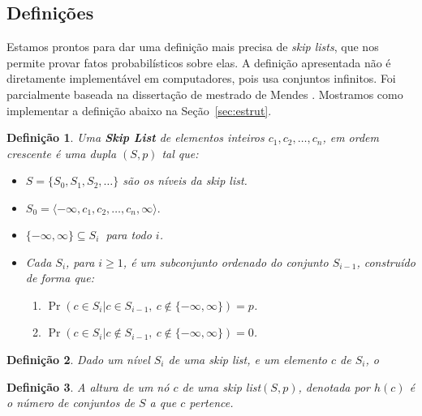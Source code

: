 \documentclass[paper=a4, fontsize=11pt]{scrartcl} %
\newtheorem{definition}{Definição}
\numberwithin{equation}{section}
\numberwithin{figure}{section}
\numberwithin{table}{section}
\numberwithin{definition}{section}
\numberwithin{theorem}{section}
\numberwithin{property}{section}
\numberwithin{proposition}{section}
\newcommand{\sls}{\textit{skip lists}\xspace}
\renewcommand{\sl}{\textit{skip list}\xspace}
\begin{document}
\FloatBarrier
\subsection{Definições}

Estamos prontos para dar uma definição mais precisa de \sls , que nos permite provar fatos probabilísticos sobre
elas.
A definição apresentada não é diretamente implementável em computadores, pois usa conjuntos infinitos. Foi
parcialmente baseada na dissertação de mestrado de Mendes \cite{mendes2008estruturas}.
Mostramos
como implementar a definição abaixo na Seção~\ref{sec:estrut}.


\begin{definition}
Uma \textbf{\emph{Skip List}} de elementos inteiros $c_1, c_2, \ldots, c_n$, em ordem crescente é uma dupla $\left( S, p \right)$ tal que:

\begin{itemize}

\item $S = \{S_0, S_1, S_2, \ldots \}$ são os níveis da \sl.

\item $S_0 = \langle -\infty, c_1, c_2, \ldots, c_n, \infty \rangle.$

\item $\{-\infty, \infty\} \subseteq S_i \ $ para todo $i$.

\item Cada $S_i$, para $i \geq 1$, é um subconjunto ordenado do conjunto $S_{i-1}$, construído de forma que:
  \begin{enumerate}[noitemsep]
    \item $\Pr(c \in S_i | c \in S_{i-1} ,\  c \notin \{-\infty, \infty\}) = p$.
    \item  $\Pr(c \in S_i | c \notin S_{i-1}, \ c \notin \{-\infty, \infty\}) = 0$.
  \end{enumerate}

\end{itemize}

\end{definition}


\begin{definition}
Dado um nível $S_i$ de uma \sl, e um elemento $c$ de $S_i$, o 
\end{definition}


\begin{definition}

A altura de um nó $c$ de uma \sl $( S, p )$, denotada por $h(c)$ é o número de conjuntos de $S$ a que $c$ pertence.

\end{definition}
\end{document}
